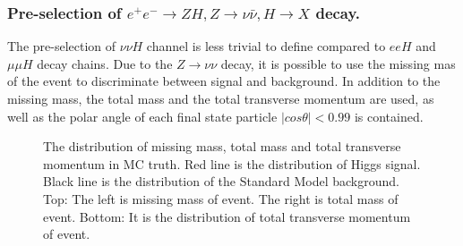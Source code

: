 \documentclass[11pt,a4paper]{cepcnote}
\begin{document}
\subsubsection{Pre-selection of $e^+e^- \rightarrow ZH, Z\rightarrow \nu\bar{\nu}, H\rightarrow X$ decay.}
The pre-selection of $\nu\nu H$ channel is less trivial to define compared to
$eeH$ and $\mu\mu H$ decay chains. Due to the $Z\to\nu\nu$ decay, it is 
possible to use the missing mas of the event to discriminate between signal 
and background. In addition to the missing mass, the total mass
and the total transverse momentum are used, as well as {\color{blue}the polar angle of each final state particle
$|cos\theta| < 0.99$ is contained}.
\begin{figure}[H]
	\centering
	\caption[]{The distribution of missing mass, total mass and total transverse momentum in MC truth. 
	Red line is the distribution of Higgs signal. Black line is the distribution of the Standard Model background.
	Top: The left is missing mass of event. The right is total mass of event.
	Bottom: It is the distribution of total transverse momentum of event.}
	\label{fig:nnHfilter}
\end{figure}
\end{document}

